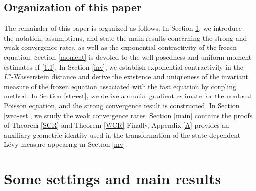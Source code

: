 \documentclass[11pt,reqno]{amsart}
\numberwithin{equation}{section}
\begin{document}
\subsection{Organization of this paper}
The remainder of this paper is organized as follows. In Section \ref{setting}, we introduce the notation, assumptions, and state the main results concerning the strong and weak convergence rates, as well as the exponential contractivity of the frozen equation. Section \ref{moment} is devoted to the well-posedness and uniform moment estimates  of \eqref{1.1}. In Section \ref{inv}, we establish exponential contractivity in the $L^p$-Wasserstein distance and derive the existence and uniqueness of the invariant measure of the frozen equation associated with the fast equation by coupling method. In Section \ref{str-est}, we derive a crucial gradient estimate for the nonlocal Poisson equation, and the strong convergence result is constructed. In Section \ref{wea-est}, we study the weak convergence rates. Section \ref{main} contains the proofs of  Theorem \ref{SCR} and Theorem \ref{WCR} Finally, Appendix \ref{A} provides an auxiliary geometric identity used in the transformation of the state-dependent Lévy measure appearing in Section \ref{inv}.







\section{Some settings and main results}\label{setting}
\end{document}
